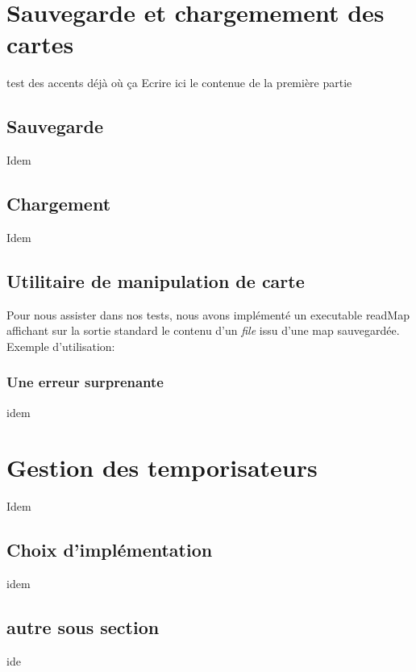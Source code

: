 \documentclass[10pt,a4paper]{article} %
\begin{document}
    \title{\rmfamily\normalfont{}}
    \author{}
    \date{\today} %
    
    \maketitle

    \begin{abstract}
      ici on fait l'introduction / résumé du projet
    \end {abstract}
    
    \tableofcontents
    
    \section{Sauvegarde et chargemement des cartes}

    test des accents déjà où ça
    Ecrire ici le contenue de la première partie
    \subsection{Sauvegarde}
    Idem
    
    \subsection{Chargement}
    Idem
    
    \subsection{Utilitaire de manipulation de carte}
    Pour nous assister dans nos tests, nous avons implémenté un executable readMap affichant sur la sortie standard le contenu d'un \emph{file} issu d'une map sauvegardée.
    Exemple d'utilisation:
    
    \subsubsection{Une erreur surprenante}
    idem
    
    \section{Gestion des temporisateurs}
    Idem
    
    \subsection{Choix d'implémentation}
    idem

    \subsection{autre sous section}
    ide
    
\end{document}
